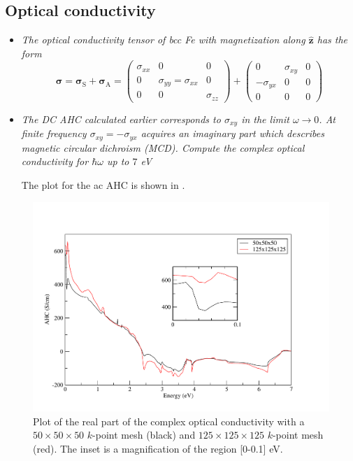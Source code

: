 \subsection*{Optical conductivity}
\begin{itemize}
	\item {\it The optical conductivity tensor of bcc Fe with magnetization along $\hat{\mathbf{z}}$ has the form }
\begin{equation}
\boldsymbol{\sigma} = \boldsymbol{\sigma}_\mathrm{S} + \boldsymbol{\sigma}_{\mathrm{A}} = 
\begin{pmatrix} 
\sigma_{xx} & 0                       & 0 \\ 
 0          & \sigma_{yy}=\sigma_{xx}  & 0 \\ 
 0          &  0                     & \sigma_{zz} 
\end{pmatrix} + \begin{pmatrix} 0 & \sigma_{xy} & 0 \\ -\sigma_{yx} & 0 & 0 \\ 0 & 0 & 0 \end{pmatrix} 
\end{equation}

	\item {\it
The DC AHC calculated earlier corresponds to $\sigma_{xy}$ in the limit $\omega \rightarrow 0$. At finite frequency $\sigma_{xy} = -\sigma_{yx}$ acquires
an imaginary part which describes magnetic circular dichroism (MCD).
Compute the complex optical conductivity for $\hbar\omega$ up to $7$ eV
}

The plot for the ac AHC is shown in .

\end{itemize} 
\begin{figure}[t!]
\centering
\includegraphics[width=0.7\columnwidth]{figure/example18/Fe-kubo_A_xy_125.pdf}
\caption{Plot of the real part of the complex optical conductivity with a $50\times50\times50$ $k$-point mesh (black) and $125\times125\times125$ $k$-point mesh (red). The inset is a magnification of the region [0-0.1] eV.}\label{fig18.4}
\end{figure}

